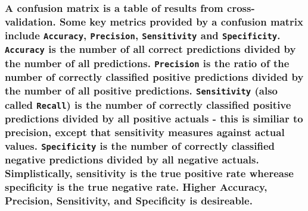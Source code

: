 \documentclass[american,]{article}
\begin{document}
{\subsubsection{\texorpdfstring{A confusion matrix is a table of results from cross-validation. Some key metrics provided by a confusion matrix include \texttt{Accuracy}, \texttt{Precision}, \texttt{Sensitivity} and \texttt{Specificity}. \texttt{Accuracy} is the number of all correct predictions divided by the number of all predictions. \texttt{Precision} is the ratio of the number of correctly classified positive predictions divided by the number of all positive predictions. \texttt{Sensitivity} (also called \texttt{Recall}) is the number of correctly classified positive predictions divided by all positive actuals - this is similiar to precision, except that sensitivity measures against actual values. \texttt{Specificity} is the number of correctly classified negative predictions divided by all negative actuals. Simplistically, sensitivity is the true positive rate wherease specificity is the true negative rate. Higher Accuracy, Precision, Sensitivity, and Specificity is desireable.}{A confusion matrix is a table of results from cross-validation. Some key metrics provided by a confusion matrix include Accuracy, Precision, Sensitivity and Specificity. Accuracy is the number of all correct predictions divided by the number of all predictions. Precision is the ratio of the number of correctly classified positive predictions divided by the number of all positive predictions. Sensitivity (also called Recall) is the number of correctly classified positive predictions divided by all positive actuals - this is similiar to precision, except that sensitivity measures against actual values. Specificity is the number of correctly classified negative predictions divided by all negative actuals. Simplistically, sensitivity is the true positive rate wherease specificity is the true negative rate. Higher Accuracy, Precision, Sensitivity, and Specificity is desireable.}}\label{a-confusion-matrix-is-a-table-of-results-from-cross-validation.-some-key-metrics-provided-by-a-confusion-matrix-include-accuracy-precision-sensitivity-and-specificity.-accuracy-is-the-number-of-all-correct-predictions-divided-by-the-number-of-all-predictions.-precision-is-the-ratio-of-the-number-of-correctly-classified-positive-predictions-divided-by-the-number-of-all-positive-predictions.-sensitivity-also-called-recall-is-the-number-of-correctly-classified-positive-predictions-divided-by-all-positive-actuals---this-is-similiar-to-precision-except-that-sensitivity-measures-against-actual-values.-specificity-is-the-number-of-correctly-classified-negative-predictions-divided-by-all-negative-actuals.-simplistically-sensitivity-is-the-true-positive-rate-wherease-specificity-is-the-true-negative-rate.-higher-accuracy-precision-sensitivity-and-specificity-is-desireable.}}
\end{document}
